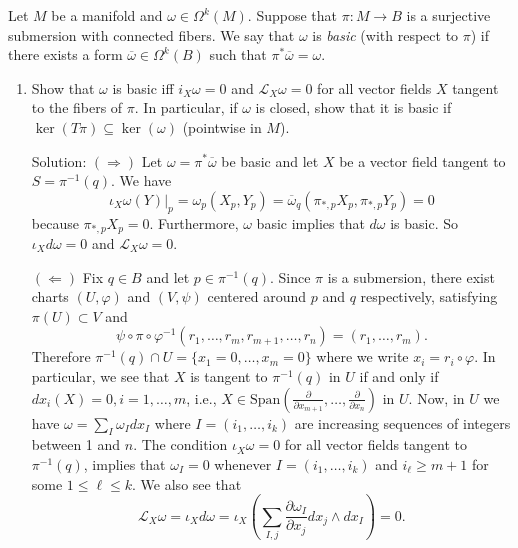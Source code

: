 \begin{example}
    Let $M$ be a manifold and $\omega \in \Omega^k(M)$. 
    Suppose that $\pi : M \to B$ is a surjective submersion with connected fibers. 
    We say that $\omega$ is \textit{basic} (with respect to $\pi$) if there exists a form $\overline{\omega} \in \Omega^k(B)$ 
    such that $\pi^*\overline{\omega} = \omega$.

\begin{enumerate}
    \item[(a)] Show that $\omega$ is basic iff $i_X\omega = 0$ and $\mathcal{L}_X\omega = 0$ for all vector fields $X$ tangent 
    to the fibers of $\pi$. In particular, if $\omega$ is closed, show that it is basic if 
    $\ker(T\pi) \subseteq \ker(\omega)$ (pointwise in $M$).\par 
    Solution: $(\Rightarrow)$ Let $\omega=\pi^*\overline{\omega}$ be basic and let $X$ be a vector field tangent to $S=\pi^{-1}(q)$. 
    We have 
    \begin{equation}
        \iota_X\omega(Y)\big|_p=\omega_p(X_p,Y_p)=\overline{\omega}_q(\pi_{*,p}X_p,\pi_{*,p}Y_p)=0
    \end{equation}
    because $\pi_{*,p}X_p=0$. Furthermore, $\omega$ basic implies that $d\omega$ is basic. So $\iota_Xd\omega=0$ and 
    $\mathcal{L}_X\omega=0$.\par 
    $(\Leftarrow)$ Fix $q\in B$ and let $p\in \pi^{-1}(q)$. Since $\pi$ is a submersion, there exist charts 
    $(U,\varphi)$ and $(V,\psi)$ centered around $p$ and $q$ respectively, satisfying $\pi(U)\subset V$ and 
    \begin{equation}
        \psi\circ\pi\circ\varphi^{-1}(r_1,\dots,r_m,r_{m+1},\dots,r_n)=(r_1,\dots,r_m).
    \end{equation}
    Therefore $\pi^{-1}(q)\cap U=\{x_1=0,\dots,x_m=0\}$ where we write $x_i=r_i\circ\varphi$. In particular, we see that 
    $X$ is tangent to $\pi^{-1}(q)$ in $U$ if and only if $dx_i(X)=0,i=1,\dots,m$, i.e., 
    $X\in\text{Span}(\tfrac{\partial}{\partial x_{m+1}},\dots,\tfrac{\partial}{\partial x_n})$ in $U$. Now, in $U$ we have 
    $\omega=\sum_I\omega_Idx_I$ where $I=(i_1,\dots, i_k)$ are increasing sequences of integers between 1 and $n$. The condition 
    $\iota_X\omega=0$ for all vector fields tangent to $\pi^{-1}(q)$, implies that $\omega_I=0$ whenever 
    $I=(i_1,\dots, i_k)$ and $i_\ell\geq m+1$ for some $1\leq\ell\leq k$. We also see that  
    \begin{equation}
        \mathcal{L}_X\omega = \iota_Xd\omega 
        = \iota_X(\sum_{I,j}\frac{\partial\omega_I}{\partial x_j}dx_j\wedge dx_I)=0.

\end{equation}
\end{enumerate}
\end{example}
